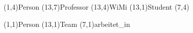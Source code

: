 \documentclass[11pt,a4paper]{article}
\begin{document}
\begin{schema}
  \entity(1,4){Person}
  \relation(13,7){Professor}
  \relation(13,4){WiMi}
  \relation(13,1){Student}
  \cluster(7,4)
\end{schema}

\begin{schema}
  \entity(1,1){Person}
  \entity(13,1){Team}
  \relation(7,1){arbeitet\_in}
\end{schema}
\end{document}
